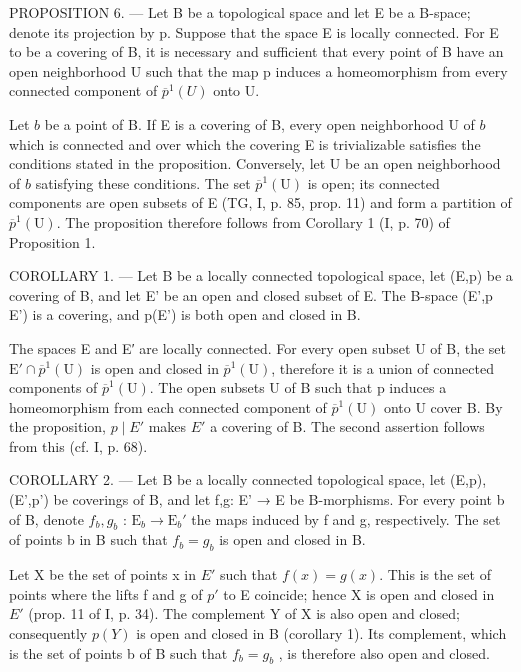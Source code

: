PROPOSITION 6. --- Let B be a topological space and let E be a B-space; denote its projection by p. Suppose that the space E is locally connected. For E to be a covering of B, it is necessary and sufficient that every point of B have an open neighborhood U such that the map p induces a homeomorphism from every connected component of \(\overline{p}^{1}(U)\) onto U.

Let \(b\) be a point of B. If E is a covering of B, every open neighborhood U of \(b\) which is connected and over which the covering E is trivializable satisfies the conditions stated in the proposition. Conversely, let U be an open neighborhood of \(b\) satisfying these conditions. The set \(\overline{p}^{1}(\mathrm{U})\) is open; its connected components are open subsets of E (TG, I, p. 85, prop. 11) and form a partition of \(\overline{p}^{1}(\mathrm{U})\). The proposition therefore follows from Corollary 1 (I, p. 70) of Proposition 1.

COROLLARY 1. — Let B be a locally connected topological space, let (E,p) be a covering of B, and let E' be an open and closed subset of E. The B-space (E',p \textbar{} E') is a covering, and p(E') is both open and closed in B.

The spaces E and E′ are locally connected. For every open subset U of B, the set \(\mathrm{E}'\cap\overline{p}^{1}(\mathrm{U})\) is open and closed in \(\overline{p}^{1}(\mathrm{U})\), therefore it is a union of connected components of \(\overline{p}^{1}(\mathrm{U})\). The open subsets U of B such that p induces a homeomorphism from each connected component of \(\overline{p}^{1}(\mathrm{U})\) onto U cover B. By the proposition, \(p\mid E'\) makes \(E'\) a covering of B. The second assertion follows from this (cf. I, p. 68).

COROLLARY 2. --- Let B be a locally connected topological space, let (E,p), (E',p') be coverings of B, and let f,g: E' → E be B-morphisms. For every point b of B, denote \(f_b,g_b\) : \(\mathrm{E}_b\to \mathrm{E}_b'\) the maps induced by f and g, respectively. The set of points b in B such that \(f_b = g_b\) is open and closed in B.

Let X be the set of points x in \(E'\) such that \(f(x) = g(x)\). This is the set of points where the lifts f and g of \(p'\) to E coincide; hence X is open and closed in \(E'\) (prop. 11 of I, p. 34). The complement Y of X is also open and closed; consequently \(p(Y)\) is open and closed in B (corollary 1). Its complement, which is the set of points b of B such that \(f_{b} = g_{b}\) , is therefore also open and closed.

